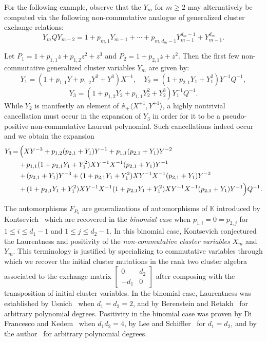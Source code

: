 \documentclass[ALCO,ThmDefs,Unicode,epreuves]{cedram}
\renewcommand{\AA}{\mathbb{A}}
\newcommand{\KK}{\mathbb{K}}
\newenvironment{introexample}{\begin{exam*}}{\end{exam*}}
\newcommand*{\Mk}{\mkern -2mu}
\begin{document}
 For the following example, observe that the $Y_m$ for $m\ge2$ may alternatively be computed via the following non-commutative analogue of generalized cluster exchange relations:
 \begin{equation}
 \label{eq:non-commutative exchange relation}
 Y_mQY_{m-2}=1+p_{m,1}Y_{m-1}+\cdots+p_{m,d_m-1}Y_{m-1}^{d_m-1}+Y_{m-1}^{d_m}.
 \end{equation}
 \begin{introexample}
 Let $P_1=1+p_{1,1}z+p_{1,2}z^2+z^3$ and $P_2=1+p_{2,1}z+z^2$.
 Then the first few non-commutative generalized cluster variables $Y_m$ are given by:
 \[ Y_1=(1+p_{1,1}Y+p_{1,2}Y^2+Y^3)X^{-1}, \quad Y_2=(1+p_{2,1}Y_1+Y_1^2)Y^{-1}Q^{-1},\]
 \[Y_3=(1+p_{1,2}Y_2+p_{1,1}Y_2^2+Y_2^3)Y_1^{-1}Q^{-1}.\]
 While $Y_2$ is manifestly an element of $\AA_+\langle X^{\pm1},Y^{\pm1}\rangle$, a highly nontrivial cancellation must occur in the expansion of $Y_3$ in order for it to be a pseudo-positive non-commutative Laurent polynomial.
 Such cancellations indeed occur and we obtain the expansion
 \begin{align*}
 Y_3&\Mk =\Mk 
 \Big(XY^{-3}+p_{1,2}(p_{2,1}+Y_1)Y^{-1}+p_{1,1}(p_{2,1}+Y_1)Y^{-2}\\
 &\quad +\Mk p_{1,1}(1+p_{2,1}Y_1+Y_1^2)XY^{-1}X^{-1}(p_{2,1}+Y_1)Y^{-1}\\
 &\quad +\Mk (p_{2,1}+Y_1)Y^{-3}+(1+p_{2,1}Y_1+Y_1^2)XY^{-1}X^{-1}(p_{2,1}+Y_1)Y^{-2}\\
 &\quad +\Mk (1+p_{2,1}Y_1+Y_1^2)XY^{-1}X^{-1}(1+p_{2,1}Y_1+Y_1^2)XY^{-1}X^{-1}(p_{2,1}+Y_1)Y^{-1}\Big)Q^{-1}.
 \end{align*}
 \end{introexample}

 The automorphisms $F_{P_k}$ are generalizations of automorphisms of $\KK$ introduced by Kontsevich~\cite{kontsevich} which are recovered in the \emph{binomial case} when $p_{1,i}=0=p_{2,j}$ for $1\le i\le d_1-1$ and $1\le j\le d_2-1$.
 In this binomial case, Kontsevich conjectured the Laurentness and positivity of the \emph{non-commutative cluster variables} $X_m$ and $Y_m$.
 This terminology is justified by specializing to commutative variables through which we recover the initial cluster mutations in the rank two cluster algebra~\cite{fomin-zelevinsky} associated to the exchange matrix $\left[\begin{array}{cc} 0 & d_2\\ -d_1 & 0\end{array}\right]$ after composing with the transposition of initial cluster variables.
 In the binomial case, Laurentness was established by Usnich~\cite{usnich0} when $d_1=d_2=2$, and by Berenstein and Retakh~\cite{berenstein-retakh} for arbitrary polynomial degrees.
 Positivity in the binomial case was proven by Di Francesco and Kedem~\cite{difrancesco-kedem} when $d_1d_2=4$, by Lee and Schiffler~\cite{lee-schiffler} for $d_1=d_2$, and by the author~\cite{rupel1} for arbitrary polynomial degrees.
\end{document}
